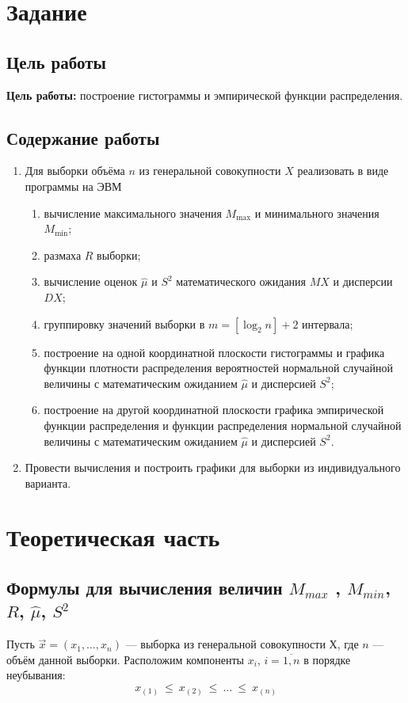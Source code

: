 \chapter{Задание}
\section{Цель работы}
\textbf{Цель работы:} построение гистограммы и эмпирической функции распределения.
\section{Содержание работы}
\begin{enumerate}
	\item Для выборки объёма $n$ из генеральной совокупности $X$ реализовать в виде программы на ЭВМ
	\begin{enumerate}
		\item вычисление максимального значения $M_{\max}$ и минимального значения $M_{\min}$;
		\item размаха $R$ выборки;
		\item вычисление оценок $\hat\mu$ и $S^2$ математического ожидания $MX$ и дисперсии $DX$;
		\item группировку значений выборки в $m = [\log_2 n] + 2$ интервала;
		\item построение на одной координатной плоскости гистограммы и графика функции плотности распределения вероятностей нормальной случайной величины с математическим ожиданием $\hat{\mu}$ и дисперсией $S^2$;
		\item построение на другой координатной плоскости графика эмпирической функции распределения и функции распределения нормальной случайной величины с математическим ожиданием $\hat{\mu}$ и дисперсией $S^2$.
	\end{enumerate}
	\item Провести вычисления и построить графики для выборки из индивидуального варианта.
\end{enumerate}


\chapter{Теоретическая часть}
\section{Формулы для вычисления величин $M_{max}$ , $M_{min}$, $R$, $\hat\mu$, $S^2$}

Пусть $\vec{x} = (x_1, \dots, x_n)$ --- выборка из генеральной совокупности Х, где $n$ --- объём данной выборки.
Расположим компоненты $x_i$, $i=\overline{1,n}$ в порядке неубывания: 
\begin{equation}
	\label{eq:leq}
	x_{(1)}~\leq~x_{(2)}~\leq~\dots~\leq~x_{(n)}
\end{equation}

